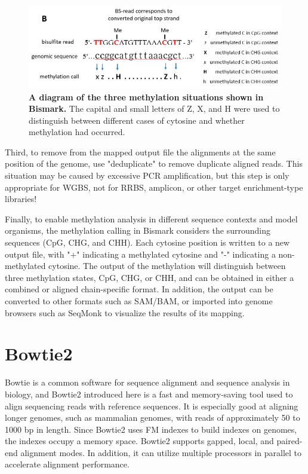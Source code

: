 \documentclass{PHlab-thesis}
\begin{document}
\begin{figure}[h!]
  \centering
  \includegraphics[scale=0.8]{figures/bismark-b.png}
  \caption{\textbf{A diagram of the three methylation situations shown in Bismark.}
  The capital and small letters of Z, X, and H were used to distinguish between different cases of cytosine and whether methylation had occurred.}
  \label{f4}
\end{figure}


Third, to remove from the mapped output file the alignments at the same position of the genome, use "deduplicate" to remove duplicate aligned reads. This situation may be caused by excessive PCR amplification, but this step is only appropriate for WGBS, not for RRBS, amplicon, or other target enrichment-type libraries!

Finally, to enable methylation analysis in different sequence contexts and model organisms, the methylation calling in Bismark considers the surrounding sequences (CpG, CHG, and CHH). Each cytosine position is written to a new output file, with "+" indicating a methylated cytosine and "-" indicating a non-methylated cytosine. The output of the methylation will distinguish between three methylation states, CpG, CHG, or CHH, and can be obtained in either a combined or aligned chain-specific format. In addition, the output can be converted to other formats such as SAM/BAM, or imported into genome browsers such as SeqMonk to visualize the results of its mapping.

\section{Bowtie2}
Bowtie is a common software for sequence alignment and sequence analysis in biology, and Bowtie2 introduced here is a fast and memory-saving tool used to align sequencing reads with reference sequences\cite{langmead2012fast}. It is especially good at aligning longer genomes, such as mammalian genomes, with reads of approximately 50 to 1000 bp in length. Since Bowtie2 uses FM indexes to build indexes on genomes, the indexes occupy a memory space. Bowtie2 supports gapped, local, and paired-end alignment modes. In addition, it can utilize multiple processors in parallel to accelerate alignment performance.
\end{document}
